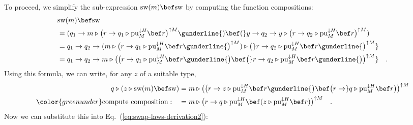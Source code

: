 To proceed, we simplify the sub-expression $\text{sw}(m)\bef\text{sw}$
by computing the function compositions:
\begin{align*}
 & \text{sw}(m)\bef\text{sw}\\
 & =(q_{1}\rightarrow m\triangleright\big(r\rightarrow q_{1}\triangleright\text{pu}_{M}^{\downarrow H}\bef r\big)^{\uparrow M}\gunderline{)\bef(}y\rightarrow q_{2}\rightarrow y\triangleright\big(r\rightarrow q_{2}\triangleright\text{pu}_{M}^{\downarrow H}\bef r\big)^{\uparrow M})\\
 & =q_{1}\rightarrow q_{2}\rightarrow(m\triangleright\big(r\rightarrow q_{1}\triangleright\text{pu}_{M}^{\downarrow H}\bef r\gunderline{\big)^{\uparrow M})\triangleright\big(}r\rightarrow q_{2}\triangleright\text{pu}_{M}^{\downarrow H}\bef r\gunderline{\big)^{\uparrow M}}\\
 & =q_{1}\rightarrow q_{2}\rightarrow m\triangleright\big(\big(r\rightarrow q_{1}\triangleright\text{pu}_{M}^{\downarrow H}\bef r\gunderline{\big)\bef\big(}r\rightarrow q_{2}\triangleright\text{pu}_{M}^{\downarrow H}\bef r\gunderline{\big)\big)^{\uparrow M}}\quad.
\end{align*}
Using this formula, we can write, for any $z$ of a suitable type,
\begin{align}
q\triangleright(z\triangleright\text{sw}(m)\bef\text{sw}) & =m\triangleright\big(\big(r\rightarrow z\triangleright\text{pu}_{M}^{\downarrow H}\bef r\gunderline{\big)\bef\big(r\rightarrow}q\triangleright\text{pu}_{M}^{\downarrow H}\bef r\big)\big)^{\uparrow M}\nonumber \\
{\color{greenunder}\text{compute composition}:}\quad & =m\triangleright\big(r\rightarrow q\triangleright\text{pu}_{M}^{\downarrow H}\bef(z\triangleright\text{pu}_{M}^{\downarrow H}\bef r)\big)^{\uparrow M}\quad.\label{eq:swap-law-3-derivation-1}
\end{align}
Now we can substitute this into Eq.~(\ref{eq:swap-laws-derivation2}):
